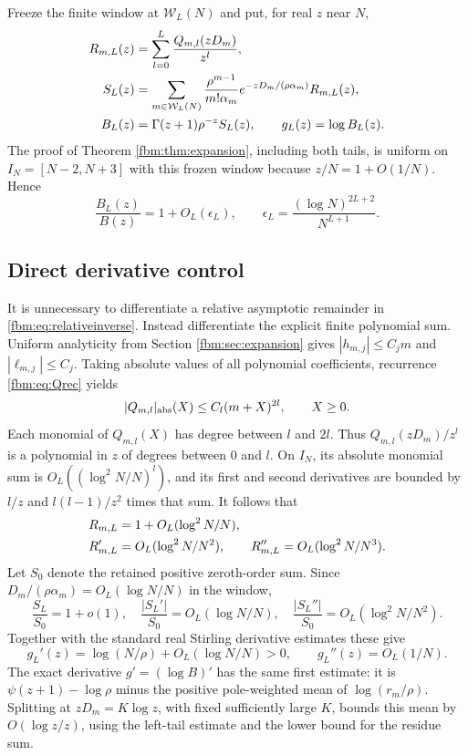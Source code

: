 \documentclass[11pt]{article}
\theoremstyle{remark}\newtheorem{remark}[theorem]{Remark}
\begin{document}
Freeze the finite window at $\mathcal W_L(N)$ and put, for real $z$ near $N$,
\begin{align}
 R_{m,L}(z)&=\sum_{l=0}^L\frac{Q_{m,l}(zD_m)}{z^l},\notag\\
 S_L(z)&=\sum_{m\in\mathcal W_L(N)}
 \frac{\rho^{m-1}}{m!\alpha_m}e^{-zD_m/(\rho\alpha_m)}R_{m,L}(z),\label{fbm:eq:finiteinverse}\\
 B_L(z)&=\Gamma(z+1)\rho^{-z}S_L(z),\qquad g_L(z)=\log B_L(z).\notag
\end{align}
The proof of Theorem \ref{fbm:thm:expansion}, including both tails, is uniform on $I_N=[N-2,N+3]$ with this frozen window because $z/N=1+O(1/N)$. Hence
\begin{equation}\label{fbm:eq:relativeinverse}
 \frac{B_L(z)}{B(z)}=1+O_L(\epsilon_L),\qquad
 \epsilon_L=\frac{(\log N)^{2L+2}}{N^{L+1}}.
\end{equation}

\subsection{Direct derivative control}
It is unnecessary to differentiate a relative asymptotic remainder in \eqref{fbm:eq:relativeinverse}. Instead differentiate the explicit finite polynomial sum. Uniform analyticity from Section \ref{fbm:sec:expansion} gives $|h_{m,j}|\leq C_jm$ and $|\ell_{m,j}|\leq C_j$. Taking absolute values of all polynomial coefficients, recurrence \eqref{fbm:eq:Qrec} yields
\[
 |Q_{m,l}|_{\rm abs}(X)\leq C_l(m+X)^{2l},\qquad X\geq0.
\]
Each monomial of $Q_{m,l}(X)$ has degree between $l$ and $2l$. Thus $Q_{m,l}(zD_m)/z^l$ is a polynomial in $z$ of degrees between 0 and $l$. On $I_N$, its absolute monomial sum is
$O_L((\log^2N/N)^l)$, and its first and second derivatives are bounded by $l/z$ and $l(l-1)/z^2$ times that sum. It follows that
\begin{align}
 R_{m,L}&=1+O_L(\log^2N/N),\notag\\
 R'_{m,L}&=O_L(\log^2N/N^2),\qquad
 R''_{m,L}=O_L(\log^2N/N^3).\label{fbm:eq:Rderivs}
\end{align}
Let $S_0$ denote the retained positive zeroth-order sum. Since $D_m/(\rho\alpha_m)=O_L(\log N/N)$ in the window,
\[
 \frac{S_L}{S_0}=1+o(1),\quad
 \frac{|S_L'|}{S_0}=O_L(\log N/N),\quad
 \frac{|S_L''|}{S_0}=O_L(\log^2N/N^2).
\]
Together with the standard real Stirling derivative estimates these give
\begin{equation}\label{fbm:eq:gderivs}
 g_L'(z)=\log(N/\rho)+O_L(\log N/N)>0,\qquad
 g_L''(z)=O_L(1/N).
\end{equation}
The exact derivative $g'=(\log B)'$ has the same first estimate: it is $\psi(z+1)-\log\rho$ minus the positive pole-weighted mean of $\log(r_m/\rho)$. Splitting at $zD_m=K\log z$, with fixed sufficiently large $K$, bounds this mean by $O(\log z/z)$, using the left-tail estimate and the lower bound for the residue sum.
\end{document}
